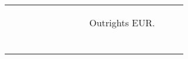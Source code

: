 \documentclass[a4paper,twoside]{report}
\begin{document}
 
\begin{figure}[htbp]
 \begin{tabular}[c]{cc}
 \begin{subfigure}[c]{0.5\textwidth}
 
 \end{subfigure}&
 \begin{subfigure}[c]{0.5\textwidth}
 \caption{Outrights EUR.}
 \label{fig:Outrights EUR}
 
 \null\hfill
 \end{subfigure}\\
 
 
 \begin{subfigure}[c]{0.5\textwidth}
 
 \null\hfill
 \end{subfigure}&
 

\end{tabular}
\end{figure}
\end{document}
